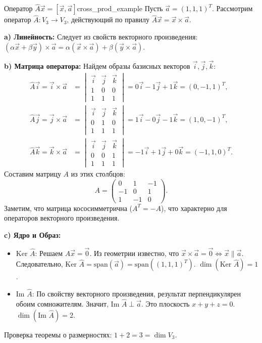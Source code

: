 \documentclass[12pt,a4paper]{article}
\begin{document}
  \begin{definition}{Оператор $\hat{A}\vec{x} = [\vec{x},
    \vec{a}]$}{cross_prod_example}
    Пусть $\vec{a} = (1, 1, 1)^T$. Рассмотрим оператор $\hat{A}: V_3
    \to V_3$, действующий по правилу $\hat{A}\vec{x} = \vec{x} \times \vec{a}$.

  \textbf{a) Линейность:} Следует из свойств векторного произведения:
  $(\alpha\vec{x} + \beta\vec{y}) \times \vec{a} = \alpha(\vec{x}
  \times \vec{a}) + \beta(\vec{y} \times \vec{a})$.

\textbf{b) Матрица оператора:}
Найдем образы базисных векторов $\vec{i}, \vec{j}, \vec{k}$:
\begin{align*}
  \hat{A}\vec{i} = \vec{i} \times \vec{a} &=
  \begin{vmatrix} \vec{i} & \vec{j} & \vec{k} \\ 1 & 0 & 0 \\ 1 & 1 & 1
  \end{vmatrix} = 0\vec{i} - 1\vec{j} + 1\vec{k} = (0, -1, 1)^T, \\
  \hat{A}\vec{j} = \vec{j} \times \vec{a} &=
  \begin{vmatrix} \vec{i} & \vec{j} & \vec{k} \\ 0 & 1 & 0 \\ 1 & 1 & 1
  \end{vmatrix} = 1\vec{i} - 0\vec{j} - 1\vec{k} = (1, 0, -1)^T, \\
  \hat{A}\vec{k} = \vec{k} \times \vec{a} &=
  \begin{vmatrix} \vec{i} & \vec{j} & \vec{k} \\ 0 & 0 & 1 \\ 1 & 1 & 1
  \end{vmatrix} = -1\vec{i} + 1\vec{j} + 0\vec{k} = (-1, 1, 0)^T.
\end{align*}
Составим матрицу $A$ из этих столбцов:
\[
  A =
  \begin{pmatrix} 0 & 1 & -1 \\ -1 & 0 & 1 \\ 1 & -1 & 0
  \end{pmatrix}.
\]
Заметим, что матрица кососимметрична ($A^T = -A$), что характерно для
операторов векторного произведения.

\textbf{c) Ядро и Образ:}
\begin{itemize}
\item $\text{Ker } \hat{A}$: Решаем $A\vec{x} = \vec{0}$. Из
  геометрии известно, что $\vec{x} \times \vec{a} = \vec{0} \iff
  \vec{x} \parallel \vec{a}$.
  Следовательно, $\text{Ker } \hat{A} = \text{span}(\vec{a}) =
  \text{span}((1,1,1)^T)$. $\dim(\text{Ker } \hat{A}) = 1$.
\item $\text{Im } \hat{A}$: По свойству векторного произведения,
  результат перпендикулярен обоим сомножителям. Значит, $\text{Im }
  \hat{A} \perp \vec{a}$.
  Это плоскость $x + y + z = 0$. $\dim(\text{Im } \hat{A}) = 2$.
\end{itemize}
Проверка теоремы о размерностях: $1 + 2 = 3 = \dim V_3$.


\end{definition}
\end{document}
